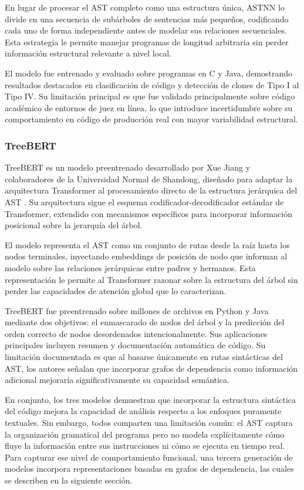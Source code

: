 En lugar de procesar el AST completo como una estructura única, ASTNN lo divide 
en una secuencia de subárboles de sentencias más pequeños, codificando cada uno 
de forma independiente antes de modelar sus relaciones secuenciales. Esta 
estrategia le permite manejar programas de longitud arbitraria sin perder 
información estructural relevante a nivel local.

El modelo fue entrenado y evaluado sobre programas en C y Java, demostrando 
resultados destacados en clasificación de código y detección de clones de Tipo I 
al Tipo IV. Su limitación principal es que fue validado principalmente sobre 
código académico de entornos de juez en línea, lo que introduce incertidumbre 
sobre su comportamiento en código de producción real con mayor variabilidad 
estructural.

\subsubsection{TreeBERT}

TreeBERT es un modelo preentrenado desarrollado por Xue Jiang y colaboradores 
de la Universidad Normal de Shandong, diseñado para adaptar la arquitectura 
Transformer al procesamiento directo de la estructura jerárquica del AST 
\cite{Jiang2021TreeBERT}. Su arquitectura sigue el esquema codificador-decodificador 
estándar de Transformer, extendido con mecanismos específicos para incorporar 
información posicional sobre la jerarquía del árbol.

El modelo representa el AST como un conjunto de rutas desde la raíz hasta los 
nodos terminales, inyectando embeddings de posición de nodo que informan al 
modelo sobre las relaciones jerárquicas entre padres y hermanos. Esta 
representación le permite al Transformer razonar sobre la estructura del árbol 
sin perder las capacidades de atención global que lo caracterizan.

TreeBERT fue preentrenado sobre millones de archivos en Python y Java mediante 
dos objetivos: el enmascarado de nodos del árbol y la predicción del orden 
correcto de nodos desordenados intencionalmente. Sus aplicaciones principales 
incluyen resumen y documentación automática de código. Su limitación documentada 
es que al basarse únicamente en rutas sintácticas del AST, los autores señalan 
que incorporar grafos de dependencia como información adicional mejoraría 
significativamente su capacidad semántica.

En conjunto, los tres modelos demuestran que incorporar la estructura sintáctica 
del código mejora la capacidad de análisis respecto a los enfoques puramente 
textuales. Sin embargo, todos comparten una limitación común: el AST captura la 
organización gramatical del programa pero no modela explícitamente cómo fluye 
la información entre sus instrucciones ni cómo se ejecuta en tiempo real. Para 
capturar ese nivel de comportamiento funcional, una tercera generación de modelos 
incorpora representaciones basadas en grafos de dependencia, las cuales se 
describen en la siguiente sección.


